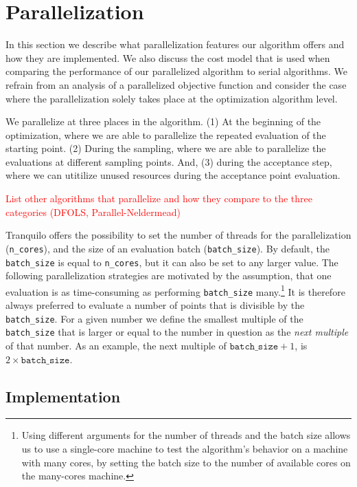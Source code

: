 \section{Parallelization}\label{sec:parallelization}

In this section we describe what parallelization features our algorithm offers and how they are
implemented. We also discuss the cost model that is used when comparing the performance of our
parallelized algorithm to serial algorithms. We refrain from an analysis of a parallelized objective
function and consider the case where the parallelization solely takes place at the optimization
algorithm level.

We parallelize at three places in the algorithm. (1) At the beginning of the optimization, where we
are able to parallelize the repeated evaluation of the starting point. (2) During the sampling,
where we are able to parallelize the evaluations at different sampling points. And, (3) during the
acceptance step, where we can utitilize unused resources during the acceptance point evaluation.

\textcolor{red}{List other algorithms that parallelize and how they compare to the three categories
(DFOLS, Parallel-Neldermead)}

Tranquilo offers the possibility to set the number of threads for the parallelization
(\texttt{n\_cores}), and the size of an evaluation batch (\texttt{batch\_size}). By default, the
\texttt{batch\_size} is equal to \texttt{n\_cores}, but it can also be set to any larger value. The
following parallelization strategies are motivated by the assumption, that one evaluation is as
time-consuming as performing \texttt{batch\_size} many.\footnote{Using different arguments for the
number of threads and the batch size allows us to use a single-core machine to test the algorithm's
behavior on a machine with many cores, by setting the batch size to the number of available cores on
the many-cores machine.} It is therefore always preferred to evaluate a number of points that is
divisible by the \texttt{batch\_size}. For a given number we define the smallest multiple of the
\texttt{batch\_size} that is larger or equal to the number in question as the \emph{next multiple}
of that number. As an example, the next multiple of $\texttt{batch\_size} + 1$, is $2 \times
\texttt{batch\_size}$.

\subsection{Implementation}\label{subsec:parallelization::implementation}

